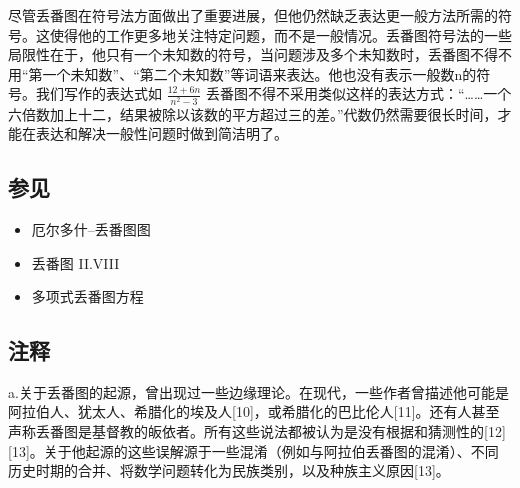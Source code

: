 尽管丢番图在符号法方面做出了重要进展，但他仍然缺乏表达更一般方法所需的符号。这使得他的工作更多地关注特定问题，而不是一般情况。丢番图符号法的一些局限性在于，他只有一个未知数的符号，当问题涉及多个未知数时，丢番图不得不用“第一个未知数”、“第二个未知数”等词语来表达。他也没有表示一般数n的符号。我们写作的表达式如 \(\frac{12+6n}{n^2-3}\) 丢番图不得不采用类似这样的表达方式：“……一个六倍数加上十二，结果被除以该数的平方超过三的差。”代数仍然需要很长时间，才能在表达和解决一般性问题时做到简洁明了。
\subsection{参见}  
\begin{itemize}
\item 厄尔多什–丢番图图  
\item 丢番图 II.VIII  
\item 多项式丢番图方程
\end{itemize}
\subsection{注释}  
a.关于丢番图的起源，曾出现过一些边缘理论。在现代，一些作者曾描述他可能是阿拉伯人、犹太人、希腊化的埃及人[10]，或希腊化的巴比伦人[11]。还有人甚至声称丢番图是基督教的皈依者。所有这些说法都被认为是没有根据和猜测性的[12][13]。关于他起源的这些误解源于一些混淆（例如与阿拉伯丢番图的混淆）、不同历史时期的合并、将数学问题转化为民族类别，以及种族主义原因[13]。

